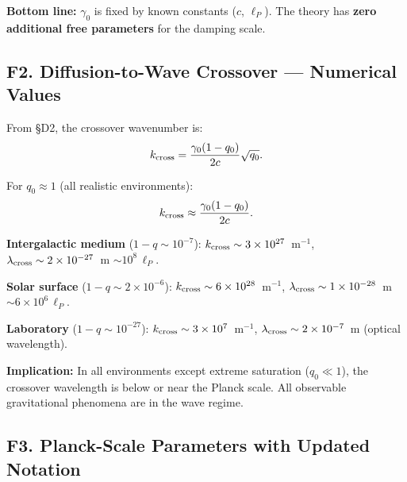 \documentclass[reprint]{revtex4-2}
\begin{document}
\textbf{Bottom line:} $\gamma_0$ is fixed by known constants ($c$, $\ell_P$). The theory has \textbf{zero additional free parameters} for the damping scale.

\subsection{F2. Diffusion-to-Wave Crossover --- Numerical Values}

From \S D2, the crossover wavenumber is:
\begin{equation}
k_{\rm cross} = \frac{\gamma_0(1-q_0)}{2c}\sqrt{q_0}.
\end{equation}

For $q_0 \approx 1$ (all realistic environments):
\begin{equation}
k_{\rm cross} \approx \frac{\gamma_0(1-q_0)}{2c}.
\end{equation}

\textbf{Intergalactic medium} ($1-q \sim 10^{-7}$): $k_{\rm cross} \sim 3\times 10^{27}$~m$^{-1}$, $\lambda_{\rm cross} \sim 2\times 10^{-27}$~m $\sim 10^{8}\,\ell_P$.

\textbf{Solar surface} ($1-q \sim 2\times 10^{-6}$): $k_{\rm cross} \sim 6\times 10^{28}$~m$^{-1}$, $\lambda_{\rm cross} \sim 1\times 10^{-28}$~m $\sim 6\times 10^{6}\,\ell_P$.

\textbf{Laboratory} ($1-q \sim 10^{-27}$): $k_{\rm cross} \sim 3\times 10^{7}$~m$^{-1}$, $\lambda_{\rm cross} \sim 2\times 10^{-7}$~m (optical wavelength).

\textbf{Implication:} In all environments except extreme saturation ($q_0 \ll 1$), the crossover wavelength is below or near the Planck scale. All observable gravitational phenomena are in the wave regime.

\subsection{F3. Planck-Scale Parameters with Updated Notation}
\end{document}
